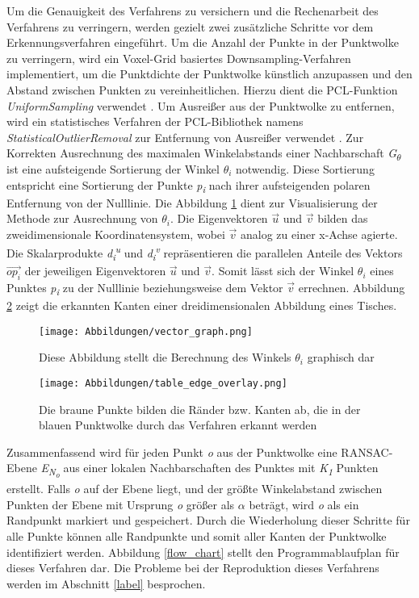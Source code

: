 Um die Genauigkeit des Verfahrens zu versichern und die Rechenarbeit des Verfahrens zu verringern, werden gezielt zwei zusätzliche Schritte vor dem Erkennungsverfahren eingeführt. Um die Anzahl der Punkte in der Punktwolke zu verringern, wird ein Voxel-Grid basiertes Downsampling-Verfahren implementiert, um die Punktdichte der Punktwolke künstlich anzupassen und den Abstand zwischen Punkten zu vereinheitlichen. Hierzu dient die PCL-Funktion \textit{UniformSampling} verwendet \autocite{noauthor_point_2023}. Um Ausreißer aus der Punktwolke zu entfernen, wird ein statistisches Verfahren der PCL-Bibliothek namens \textit{StatisticalOutlierRemoval} zur Entfernung von Ausreißer verwendet \autocite{rusu_towards_2008}. Zur Korrekten Ausrechnung des maximalen Winkelabstands einer Nachbarschaft \textit{G\textsubscript{$\theta$}} ist eine aufsteigende Sortierung der Winkel \textit{$\theta_i$} notwendig. Diese Sortierung entspricht eine Sortierung der Punkte \textit{p\textsubscript{i}} nach ihrer aufsteigenden polaren Entfernung von der Nulllinie. Die Abbildung \ref{vector_graph} dient zur Visualisierung der Methode zur Ausrechnung von $\theta_i$. Die Eigenvektoren $\vec{u}$ und $\vec{v}$ bilden das zweidimensionale Koordinatensystem, wobei $\vec{v}$ analog zu einer x-Achse agierte. Die Skalarprodukte \textit{d\textsubscript{i}\textsuperscript{u}} und \textit{d\textsubscript{i}\textsuperscript{v}} repräsentieren die parallelen Anteile des Vektors $\vec{{op}_i}$ der jeweiligen Eigenvektoren $\vec{u}$ und $\vec{v}$. Somit lässt sich der Winkel $\theta_i$ eines Punktes \textit{p\textsubscript{i}} zu der Nulllinie beziehungsweise dem Vektor $\vec{v}$ errechnen. Abbildung \ref{edge_points_table} zeigt die erkannten Kanten einer dreidimensionalen Abbildung eines Tisches.

\begin{figure}[t]
	\texttt{[image: Abbildungen/vector\_graph.png]}
	\centering
	\caption{Diese Abbildung stellt die Berechnung des Winkels $\theta_i$ graphisch dar}
	\label{vector_graph}
\end{figure}

\begin{figure}[h]
	\texttt{[image: Abbildungen/table\_edge\_overlay.png]}
	\centering
	\caption{Die braune Punkte bilden die Ränder bzw. Kanten ab, die in der blauen Punktwolke durch das Verfahren erkannt werden}
	\label{edge_points_table}
\end{figure}

Zusammenfassend wird für jeden Punkt \textit{o} aus der Punktwolke eine RANSAC-Ebene \textit{E\textsubscript{N\textsubscript{o}}} aus einer lokalen Nachbarschaften des Punktes mit \textit{K\textsubscript{1}} Punkten erstellt. Falls \textit{o} auf der Ebene liegt, und der größte Winkelabstand zwischen Punkten der Ebene mit Ursprung \textit{o} größer als $\alpha$ beträgt, wird \textit{o} als ein Randpunkt markiert und gespeichert. Durch die Wiederholung dieser Schritte für alle Punkte können alle Randpunkte und somit aller Kanten der Punktwolke identifiziert werden. Abbildung \ref{flow_chart} stellt den Programmablaufplan für dieses Verfahren dar. Die Probleme bei der Reproduktion dieses Verfahrens werden im Abschnitt \ref{label} besprochen.


